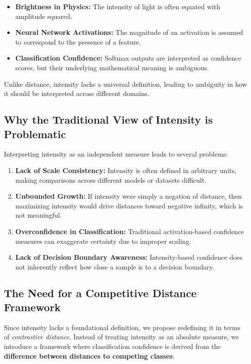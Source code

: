 \begin{itemize}
    \item \textbf{Brightness in Physics:} The intensity of light is often equated with amplitude squared.
    \item \textbf{Neural Network Activations:} The magnitude of an activation is assumed to correspond to the presence of a feature.
    \item \textbf{Classification Confidence:} Softmax outputs are interpreted as confidence scores, but their underlying mathematical meaning is ambiguous.
\end{itemize}

Unlike distance, intensity lacks a universal definition, leading to ambiguity in how it should be interpreted across different domains.

\subsection{Why the Traditional View of Intensity is Problematic}

Interpreting intensity as an independent measure leads to several problems:

\begin{enumerate}
    \item \textbf{Lack of Scale Consistency:} Intensity is often defined in arbitrary units, making comparisons across different models or datasets difficult.
    \item \textbf{Unbounded Growth:} If intensity were simply a negation of distance, then maximizing intensity would drive distances toward negative infinity, which is not meaningful.
    \item \textbf{Overconfidence in Classification:} Traditional activation-based confidence measures can exaggerate certainty due to improper scaling.
    \item \textbf{Lack of Decision Boundary Awareness:} Intensity-based confidence does not inherently reflect how close a sample is to a decision boundary.
\end{enumerate}

\subsection{The Need for a Competitive Distance Framework}

Since intensity lacks a foundational definition, we propose redefining it in terms of \textit{contrastive distance}. Instead of treating intensity as an absolute measure, we introduce a framework where classification confidence is derived from the \textbf{difference between distances to competing classes}:

